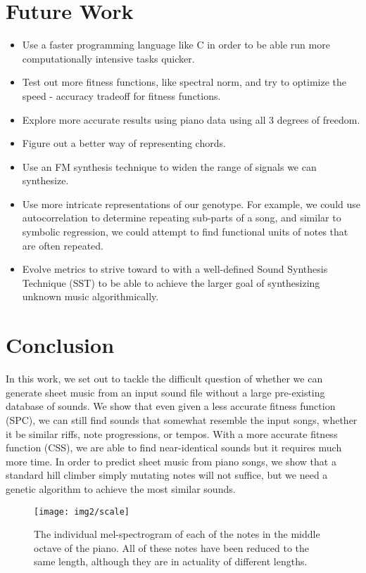 \documentclass{pnastwo}
\begin{document}
\begin{article}
\section{Future Work}
\begin{itemize}
\item Use a faster programming language like C in order to be able run more computationally intensive tasks quicker.
\item Test out more fitness functions, like spectral norm, and try to optimize the speed - accuracy tradeoff for fitness functions.
\item Explore more accurate results using piano data using all 3 degrees of freedom.
\item Figure out a better way of representing chords.
\item Use an FM synthesis technique to widen the range of signals we can synthesize. 
\item Use more intricate representations of our genotype. For example, we could use autocorrelation to determine repeating sub-parts of a song, and similar to symbolic regression, we could attempt to find functional units of notes that are often repeated.  
\item Evolve metrics to strive toward to with a well-defined Sound Synthesis Technique (SST) to be able to achieve the larger goal of synthesizing unknown music algorithmically. 
\end{itemize}
\section{Conclusion}
In this work, we set out to tackle the difficult question of whether we can generate sheet music from an input sound file without a large pre-existing database of sounds. We show that even given a less accurate fitness function (SPC), we can still find sounds that somewhat resemble the input songs, whether it be similar riffs, note progressions, or tempos. With a more accurate fitness function (CSS), we are able to find near-identical sounds but it requires much more time. In order to predict sheet music from piano songs, we show that a standard hill climber simply mutating notes will not suffice, but we need a genetic algorithm to achieve the most similar sounds.
\begin{figure*}[ht]
\centerline{\texttt{[image: img2/scale]}}
\caption{The individual mel-spectrogram of each of the notes in the middle octave of the piano. All of these notes have been reduced to the same length, although they are in actuality of different lengths.}
\end{figure*}


\end{article}
\end{document}
